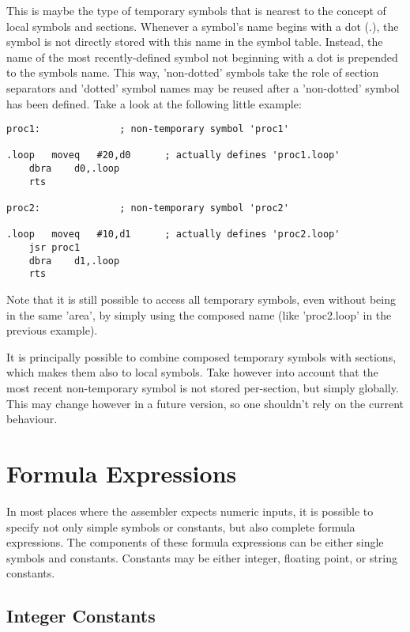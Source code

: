 \documentclass[12pt,twoside]{report}
\begin{document}
This is maybe the type of temporary symbols that is nearest to the concept
of local symbols and sections.  Whenever a symbol's name begins with a dot
(.), the symbol is not directly stored with this name in the symbol table.
Instead, the name of the most recently-defined symbol not beginning with a
dot is prepended to the symbols name.  This way, 'non-dotted' symbols take
the role of section separators and 'dotted' symbol names may be reused
after a 'non-dotted' symbol has been defined.  Take a look at the
following little example:
\begin{verbatim}
proc1:				; non-temporary symbol 'proc1'

.loop	moveq	#20,d0		; actually defines 'proc1.loop'
	dbra	d0,.loop
	rts

proc2:				; non-temporary symbol 'proc2'

.loop	moveq	#10,d1		; actually defines 'proc2.loop'
	jsr	proc1
	dbra	d1,.loop
	rts
\end{verbatim}
Note that it is still possible to access all temporary symbols, even
without being in the same 'area', by simply using the composed name (like
'proc2.loop' in the previous example).

It is principally possible to combine composed temporary symbols with
sections, which makes them also to local symbols.  Take however into
account that the most recent non-temporary symbol is not stored
per-section, but simply globally.  This may change however in a future
version, so one shouldn't rely on the current behaviour.


\section{Formula Expressions}

In most places where the assembler expects numeric inputs, it is
possible to specify not only simple symbols or constants, but also
complete formula expressions.  The components of these formula
expressions can be either single symbols and constants.  Constants may be
either integer, floating point, or string constants.

\subsection{Integer Constants}
\label{SectIntConsts}
\end{document}
